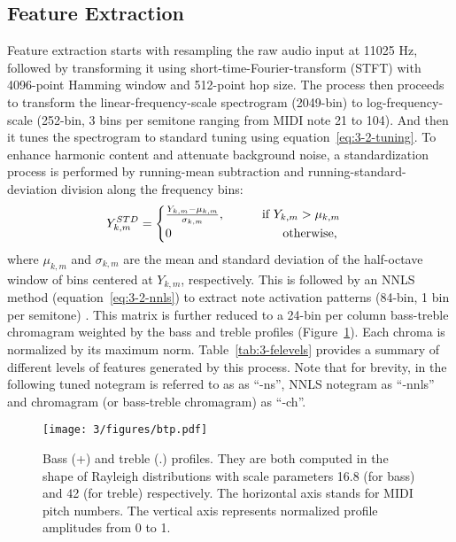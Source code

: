 \subsection{Feature Extraction} \label{sec:3-chordino-like fe}
Feature extraction starts with resampling the raw audio input at 11025 Hz, followed by transforming it using short-time-Fourier-transform (STFT) with 4096-point Hamming window and 512-point hop size. The process then proceeds to transform the linear-frequency-scale spectrogram (2049-bin) to log-frequency-scale (252-bin, 3 bins per semitone ranging from MIDI note 21 to 104). And then it tunes the spectrogram to standard tuning using equation~\ref{eq:3-2-tuning}. To enhance harmonic content and attenuate background noise, a standardization process is performed by running-mean subtraction and running-standard-deviation division along the frequency bins: %
\begin{equation}
	Y^{STD}_{k,m} = 
	\begin{cases}
		{{Y_{k,m} - \mu_{k,m}} \over \sigma_{k,m}}, \text{\quad\quad\quad if } Y_{k,m} > \mu_{k,m}\\
		0 \quad\quad\quad\quad\quad\quad\quad\quad\quad\text{otherwise,}
	\end{cases}
\end{equation}
where $\mu_{k,m}$ and $\sigma_{k,m}$ are the mean and standard deviation of the half-octave window of bins centered at $Y_{k,m}$, respectively. This is followed by an NNLS method  (equation~\ref{eq:3-2-nnls}) to extract note activation patterns (84-bin, 1 bin per semitone) \cite{mauch2010approximate}. This matrix is further reduced to a 24-bin per column bass-treble chromagram weighted by the bass and treble profiles (Figure~\ref{fig:3-btprofile}). Each chroma is normalized by its maximum norm. Table~\ref{tab:3-felevels} provides a summary of different levels of features generated by this process. Note that for brevity, in the following tuned notegram is referred to as as ``-ns'', NNLS notegram as ``-nnls'' and chromagram (or bass-treble chromagram) as ``-ch''.

\begin{figure}[htb]
\centering
\texttt{[image: 3/figures/btp.pdf]}
\caption{Bass (+) and treble (.) profiles. They are both computed in the shape of Rayleigh distributions with scale parameters 16.8 (for bass) and 42 (for treble) respectively. The horizontal axis stands for MIDI pitch numbers. The vertical axis represents normalized profile amplitudes from 0 to 1.}
\label{fig:3-btprofile}
\end{figure}

